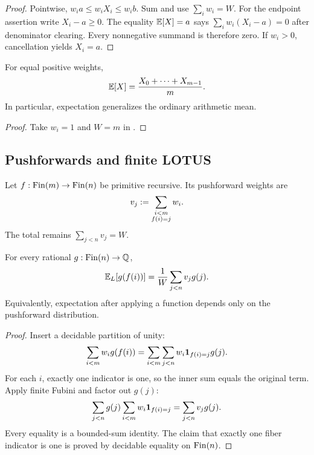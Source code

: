 \begin{proof}
Pointwise, \(w_i a\le w_iX_i\le w_i b\).  Sum and use
\(\sum_iw_i=W\).  For the endpoint assertion write \(X_i-a\ge0\).  The equality
\(\mathbb E[X]=a\) says \(\sum_iw_i(X_i-a)=0\) after denominator clearing.  Every
nonnegative summand is therefore zero.  If \(w_i>0\), cancellation yields
\(X_i=a\).
\end{proof}

\begin{corollary}\label{cor:equiprobable}
For equal positive weights,
\[
 \mathbb E[X]=\frac{X_0+\cdots+X_{m-1}}{m}.
\]
In particular, expectation generalizes the ordinary arithmetic mean.
\end{corollary}

\begin{proof}
Take \(w_i=1\) and \(W=m\) in .
\end{proof}

\subsection{Pushforwards and finite LOTUS}

\begin{definition}\label{def:pushforward}
Let \(f:\operatorname{Fin}(m)\to\operatorname{Fin}(n)\) be primitive recursive.  Its pushforward weights
are
\[
 v_j\mathrel{:=}\sum_{\substack{i<m\\f(i)=j}}w_i.
\]
The total remains \(\sum_{j<n}v_j=W\).
\end{definition}

\begin{theorem}\label{thm:finite-lotus}
For every rational \(g:\operatorname{Fin}(n)\to\mathbb Q\),
\[
 \mathbb E_L[g(f(i))]=\frac1W\sum_{j<n}v_jg(j).
\]
Equivalently, expectation after applying a function depends only on the
pushforward distribution.
\end{theorem}

\begin{proof}
Insert a decidable partition of unity:
\[
 \sum_{i<m}w_i g(f(i))
 =\sum_{i<m}\sum_{j<n}w_i\mathbf 1_{f(i)=j}g(j).
\]
For each \(i\), exactly one indicator is one, so the inner sum equals the
original term.  Apply finite Fubini and factor out \(g(j)\):
\[
 \sum_{j<n}g(j)\sum_{i<m}w_i\mathbf 1_{f(i)=j}
 =\sum_{j<n}v_jg(j).
\]
Every equality is a bounded-sum identity.  The claim that exactly one fiber
indicator is one is proved by decidable equality on \(\operatorname{Fin}(n)\).
\end{proof}

